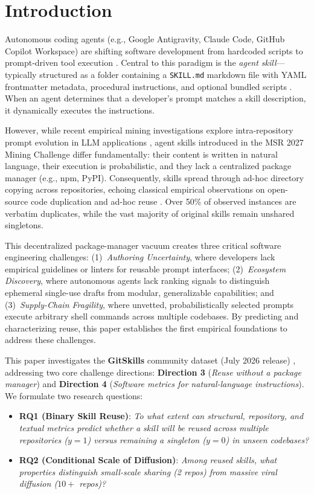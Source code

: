 \documentclass[10pt,conference]{IEEEtran}
\begin{document}
\section{Introduction}
Autonomous coding agents (e.g., Google Antigravity, Claude Code, GitHub Copilot Workspace) are shifting software development from hardcoded scripts to prompt-driven tool execution \cite{yao2023react,schick2023toolformer,jimenez2024swebench}. Central to this paradigm is the \emph{agent skill}---typically structured as a folder containing a \texttt{SKILL.md} markdown file with YAML frontmatter metadata, procedural instructions, and optional bundled scripts \cite{qin2023toolllm}. When an agent determines that a developer's prompt matches a skill description, it dynamically executes the instructions.

However, while recent empirical mining investigations explore intra-repository prompt evolution in LLM applications \cite{tafreshipour2025prompting}, agent skills introduced in the MSR 2027 Mining Challenge \cite{gitskills2027} differ fundamentally: their content is written in natural language, their execution is probabilistic, and they lack a centralized package manager (e.g., npm, PyPI). Consequently, skills spread through ad-hoc directory copying across repositories, echoing classical empirical observations on open-source code duplication and ad-hoc reuse \cite{lopes2017dejavu,haefliger2008code,mockus2002two}. Over 50\% of observed instances are verbatim duplicates, while the vast majority of original skills remain unshared singletons. 

This decentralized package-manager vacuum creates three critical software engineering challenges: (1)~\emph{Authoring Uncertainty}, where developers lack empirical guidelines or linters for reusable prompt interfaces; (2)~\emph{Ecosystem Discovery}, where autonomous agents lack ranking signals to distinguish ephemeral single-use drafts from modular, generalizable capabilities; and (3)~\emph{Supply-Chain Fragility}, where unvetted, probabilistically selected prompts execute arbitrary shell commands across multiple codebases. By predicting and characterizing reuse, this paper establishes the first empirical foundations to address these challenges.

This paper investigates the \textbf{GitSkills} community dataset (July 2026 release) \cite{gitskills2027}, addressing two core challenge directions: \textbf{Direction 3} (\emph{Reuse without a package manager}) and \textbf{Direction 4} (\emph{Software metrics for natural-language instructions}). We formulate two research questions:
\begin{itemize}
    \item \textbf{RQ1 (Binary Skill Reuse)}: \emph{To what extent can structural, repository, and textual metrics predict whether a skill will be reused across multiple repositories ($y=1$) versus remaining a singleton ($y=0$) in unseen codebases?}
    \item \textbf{RQ2 (Conditional Scale of Diffusion)}: \emph{Among reused skills, what properties distinguish small-scale sharing (2 repos) from massive viral diffusion ($10+$ repos)?}
\end{itemize}
\end{document}
